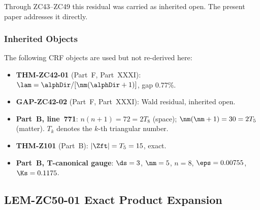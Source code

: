 \documentclass[12pt, a4paper]{article}
\begin{document}
Through ZC43--ZC49 this residual was carried as inherited open.
The present paper addresses it directly.

\subsubsection{Inherited Objects}

The following CRF objects are used but not re-derived here:
\begin{itemize}[leftmargin=2em]
\item \textbf{THM-ZC42-01} (Part~F, Part~XXXI): $\lam =
  \alphDir/[\nm(\alphDir+1)]$, gap $0.77\%$.
\item \textbf{GAP-ZC42-02} (Part~F, Part~XXXI): Wald residual,
  inherited open.
\item \textbf{Part~B, line~771}: $n(n+1)=72=2T_8$ (space);
  $\nm(\nm+1)=30=2T_5$ (matter). $T_k$ denotes the $k$-th
  triangular number.
\item \textbf{THM-Z101} (Part~B): $|\Zft| = T_5 = 15$, exact.
\item \textbf{Part~B, T-canonical gauge}: $\ds=3$, $\nm=5$,
  $n=8$, $\eps=0.00755$, $\Ks=0.1175$.
\end{itemize}

\subsection{LEM-ZC50-01 \quad Exact Product Expansion}

\end{document}
